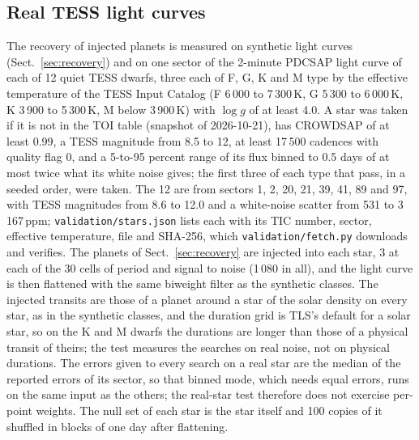 \documentclass{aastex631}
\begin{document}
\subsection{Real TESS light curves}\label{sec:realstars}
The recovery of injected planets is measured on synthetic light curves (Sect.~\ref{sec:recovery}) and on one sector of the 2-minute PDCSAP light curve of each of 12 quiet TESS dwarfs, three each of F, G, K and M type by the effective temperature of the TESS Input Catalog (F 6\,000 to 7\,300\,K, G 5\,300 to 6\,000\,K, K 3\,900 to 5\,300\,K, M below 3\,900\,K) with $\log g$ of at least 4.0. A star was taken if it is not in the TOI table (snapshot of 2026-10-21), has CROWDSAP of at least 0.99, a TESS magnitude from 8.5 to 12, at least 17\,500 cadences with quality flag 0, and a 5-to-95 percent range of its flux binned to 0.5 days of at most twice what its white noise gives; the first three of each type that pass, in a seeded order, were taken. The 12 are from sectors 1, 2, 20, 21, 39, 41, 89 and 97, with TESS magnitudes from 8.6 to 12.0 and a white-noise scatter from 531 to 3\,167\,ppm; \texttt{validation/stars.json} lists each with its TIC number, sector, effective temperature, file and SHA-256, which \texttt{validation/fetch.py} downloads and verifies. The planets of Sect.~\ref{sec:recovery} are injected into each star, 3 at each of the 30 cells of period and signal to noise (1\,080 in all), and the light curve is then flattened with the same biweight filter as the synthetic classes. The injected transits are those of a planet around a star of the solar density on every star, as in the synthetic classes, and the duration grid is TLS's default for a solar star, so on the K and M dwarfs the durations are longer than those of a physical transit of theirs; the test measures the searches on real noise, not on physical durations. The errors given to every search on a real star are the median of the reported errors of its sector, so that binned mode, which needs equal errors, runs on the same input as the others; the real-star test therefore does not exercise per-point weights. The null set of each star is the star itself and 100 copies of it shuffled in blocks of one day after flattening.
\end{document}
